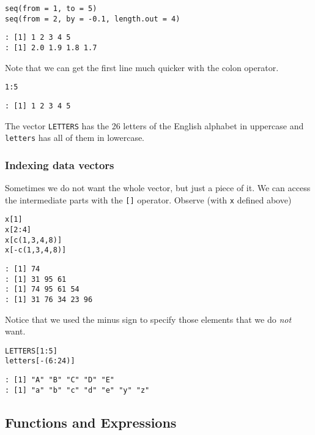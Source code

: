 \begin{Verbatim}
seq(from = 1, to = 5)
seq(from = 2, by = -0.1, length.out = 4)
\end{Verbatim}

\begin{verbatim}
: [1] 1 2 3 4 5
: [1] 2.0 1.9 1.8 1.7
\end{verbatim}

Note that we can get the first line much quicker with the colon
operator.

\begin{Verbatim}
1:5
\end{Verbatim}

\begin{verbatim}
: [1] 1 2 3 4 5
\end{verbatim}

The vector \texttt{LETTERS}  has the 26
letters of the English alphabet in uppercase and
\texttt{letters}  has all of them in
lowercase.

\subsubsection{Indexing data vectors}
\label{sec-2-3-3-2}

Sometimes we do not want the whole vector, but just a piece of it. We
can access the intermediate parts with the \texttt{[]} operator. Observe
(with \texttt{x} defined above)

\begin{Verbatim}
x[1]
x[2:4]
x[c(1,3,4,8)]
x[-c(1,3,4,8)]
\end{Verbatim}

\begin{verbatim}
: [1] 74
: [1] 31 95 61
: [1] 74 95 61 54
: [1] 31 76 34 23 96
\end{verbatim}

Notice that we used the minus sign to specify those elements that we
do \emph{not} want.

\begin{Verbatim}
LETTERS[1:5]
letters[-(6:24)]
\end{Verbatim}

\begin{verbatim}
: [1] "A" "B" "C" "D" "E"
: [1] "a" "b" "c" "d" "e" "y" "z"
\end{verbatim}

\subsection{Functions and Expressions}
\label{sec-2-3-4}

